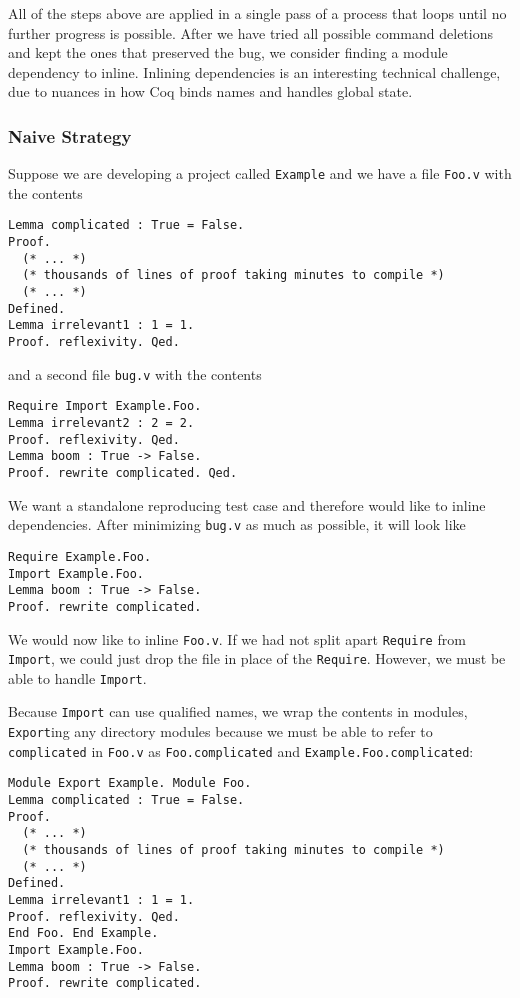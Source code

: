 \documentclass[a4paper,USenglish,cleveref,autoref,thm-restate]{lipics-v2021}
\begin{document}
All of the steps above are applied in a single pass of a process that loops until no further progress is possible.
After we have tried all possible command deletions and kept the ones that preserved the bug, we consider finding a module dependency to inline.
Inlining dependencies is an interesting technical challenge, due to nuances in how Coq binds names and handles global state.

\subsubsection{Naive Strategy}\label{sec:inline-deps}

Suppose we are developing a project called \verb|Example| and we have a file \verb|Foo.v| with the contents
\begin{verbatim}
Lemma complicated : True = False.
Proof.
  (* ... *)
  (* thousands of lines of proof taking minutes to compile *)
  (* ... *)
Defined.
Lemma irrelevant1 : 1 = 1.
Proof. reflexivity. Qed.
\end{verbatim}
and a second file \verb|bug.v| with the contents
\begin{verbatim}
Require Import Example.Foo.
Lemma irrelevant2 : 2 = 2.
Proof. reflexivity. Qed.
Lemma boom : True -> False.
Proof. rewrite complicated. Qed.
\end{verbatim}

We want a standalone reproducing test case and therefore would like to inline dependencies.
After minimizing \verb|bug.v| as much as possible, it will look like
\begin{verbatim}
Require Example.Foo.
Import Example.Foo.
Lemma boom : True -> False.
Proof. rewrite complicated.
\end{verbatim}

We would now like to inline \verb|Foo.v|.
If we had not split apart \verb|Require| from \verb|Import|, we could just drop the file in place of the \verb|Require|.
However, we must be able to handle \verb|Import|.

Because \verb|Import| can use qualified names, we wrap the contents in modules, \verb|Export|ing any directory modules because we must be able to refer to \verb|complicated| in \verb|Foo.v| as \verb|Foo.complicated| and \verb|Example.Foo.complicated|:
\begin{verbatim}
Module Export Example. Module Foo.
Lemma complicated : True = False.
Proof.
  (* ... *)
  (* thousands of lines of proof taking minutes to compile *)
  (* ... *)
Defined.
Lemma irrelevant1 : 1 = 1.
Proof. reflexivity. Qed.
End Foo. End Example.
Import Example.Foo.
Lemma boom : True -> False.
Proof. rewrite complicated.
\end{verbatim}
\end{document}
